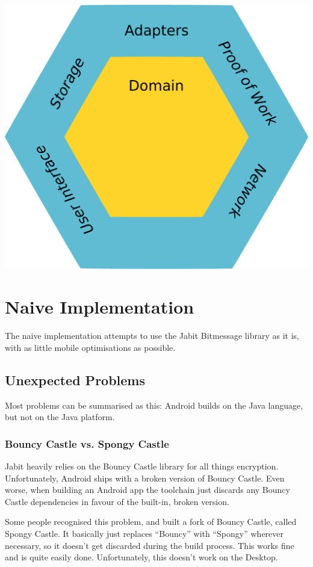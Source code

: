 \documentclass{bfh}
\begin{document}
  \includegraphics[width=\textwidth]{images/ports_and_adapters.pdf}
  
  \section{Naive Implementation}
  
  The naive implementation attempts to use the Jabit Bitmessage library as it is, with as little mobile optimisations as possible.

  \subsection{Unexpected Problems}
  Most problems can be summarised as this: Android builds on the Java language, but not on the Java platform.
  
  \subsubsection{Bouncy Castle vs. Spongy Castle}
  Jabit heavily relies on the Bouncy Castle library for all things encryption. Unfortunately, Android ships with a broken version of Bouncy Castle. Even worse, when building an Android app the toolchain just discards any Bouncy Castle dependencies in favour of the built-in, broken version.

  Some people recognised this problem, and built a fork of Bouncy Castle, called Spongy Castle. It basically just replaces “Bouncy” with “Spongy” wherever necessary, so it doesn’t get discarded during the build process. This works fine and is quite easily done. Unfortunately, this doesn’t work on the Desktop.
\end{document}
